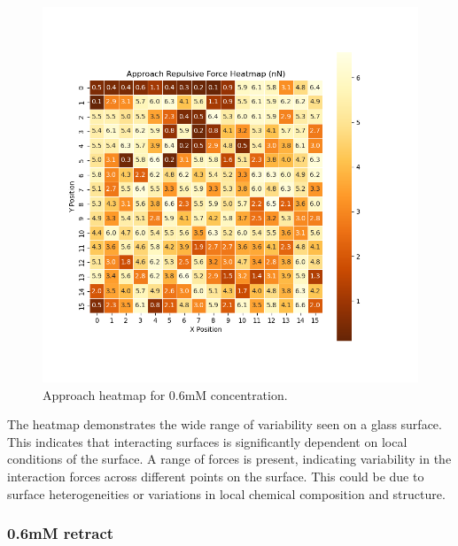 
\begin{figure}[h]
    \centering
    \includegraphics[width=\textwidth]{chapter7/ForceMaps/0.5mM/Approach heatmap.png}
    \caption{Approach heatmap for 0.6mM concentration.}
    \label{fig:approach_heatmap_0.5mM}
\end{figure}

The heatmap demonstrates the wide range of variability seen on a glass surface. This indicates that interacting surfaces is significantly dependent on local conditions of the surface. A range of forces is present, indicating variability in the interaction forces across different points on the surface. This could be due to surface heterogeneities or variations in local chemical composition and structure. 
\newpage

\subsubsection{0.6mM retract}

